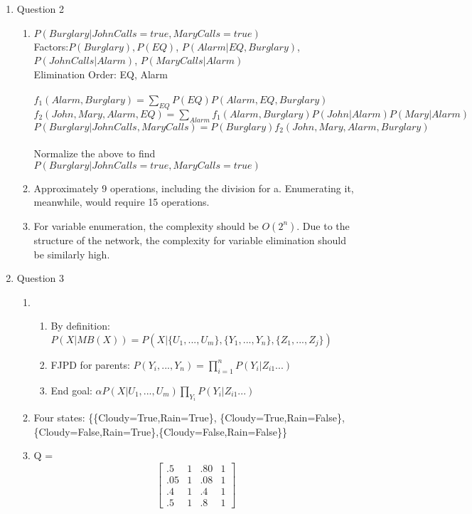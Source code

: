 \documentclass[11pt]{article}
\begin{document}
\begin{enumerate}
\begin{enumerate}
\end{enumerate}

\item Question 2
\begin{enumerate}
\item $P(Burglary|JohnCalls = true, MaryCalls = true)$
\\Factors:$ P(Burglary), P(EQ)$, $P(Alarm|EQ, Burglary)$,$ P(JohnCalls|Alarm)$, $P(MaryCalls|Alarm)$
\\Elimination Order: EQ, Alarm
\\
\\$f_{1}(Alarm, Burglary) = \sum_{EQ} P(EQ) P(Alarm, EQ, Burglary)$
\\$f_{2}(John, Mary, Alarm, EQ) = \sum_{Alarm}f_{1}(Alarm,Burglary)P(John|Alarm)P(Mary|Alarm)$
\\$P(Burglary|JohnCalls,MaryCalls) = P(Burglary)f_{2}(John, Mary, Alarm, Burglary)$
\\
\\Normalize the above to find $P(Burglary|JohnCalls = true, MaryCalls = true)$
\item Approximately 9 operations, including the division for a. Enumerating it, meanwhile, would require 15 operations.
\item For variable enumeration, the complexity should be $O(2^n)$. Due to the structure of the network, the complexity for variable elimination should be similarly high.
\end {enumerate}

\item Question 3
\begin{enumerate}
\item
\begin{enumerate}
\item By definition: $P(X|MB(X)) = P(X|\{U_1, ..., U_m\}, \{Y_1, ..., Y_n\}, \{Z_1, ..., Z_j\}) $
\item FJPD for parents: $P(Y_i, ..., Y_n) = \prod_{i=1}^{n} P(Y_i | Z_{i1}...)$ 
\item End goal: $\alpha P(X|U_1, ..., U_m) \prod_{Y_i} P(Y_i | Z_{i1} ...)$
\end{enumerate}
\item Four states: \{\{Cloudy=True,Rain=True\}, \{Cloudy=True,Rain=False\}, \\
 \{Cloudy=False,Rain=True\},\{Cloudy=False,Rain=False\}\}
\item Q = \[
\begin{bmatrix}
	.5 & 1 & .80 & 1 \\
	.05 & 1 & .08 & 1 \\
	.4 & 1 & .4 & 1 \\
	.5 & 1 & .8 & 1
\end{bmatrix}
\]
\end{enumerate}


\end{enumerate}
\end{document}
